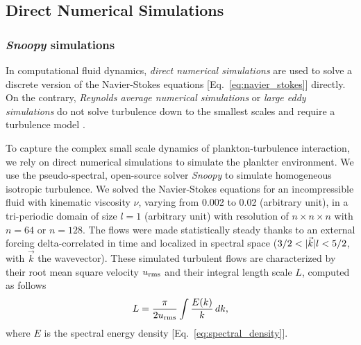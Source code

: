 \subsection{Direct Numerical Simulations}

\subsubsection{\textit{Snoopy} simulations}

In computational fluid dynamics, \textit{direct numerical simulations} are used to solve a discrete version of the Navier-Stokes equations [Eq.~\eqref{eq:navier_stokes}] directly.
On the contrary, \textit{Reynolds average numerical simulations} or \textit{large eddy simulations} do not solve turbulence down to the smallest scales and require a turbulence model \citep{lesieur2014turbulence}.

To capture the complex small scale dynamics of plankton-turbulence interaction, we rely on direct numerical simulations to simulate the plankter environment.
We use the pseudo-spectral, open-source solver \textit{Snoopy} \citep{lesur2005relevance, lesur2007impact} to simulate homogeneous isotropic turbulence.
We solved the Navier-Stokes equations for an incompressible fluid with kinematic viscosity $\nu$, varying from 0.002 to 0.02 (arbitrary unit), in a tri-periodic domain of size $l = 1$ (arbitrary unit) with resolution of $n \times n \times n$ with $n=64$ or $n=128$.
The flows were made statistically steady thanks to an external forcing delta-correlated in time and localized in spectral space ($3/2 < \lvert\vec{k}\rvert l < 5/2$, with $\vec{k}$ the wavevector).
These simulated turbulent flows are characterized by their root mean square velocity $u_{\mathrm{rms}}$ and their integral length scale $L$, computed as follows
\begin{equation}\label{eq:integral_scale}
	L = \frac{\pi}{2 u_{\mathrm{rms}}} \int \frac{E(k)}{k} \, dk,
\end{equation}
where $E$ is the spectral energy density [Eq.~\eqref{eq:spectral_density}].

